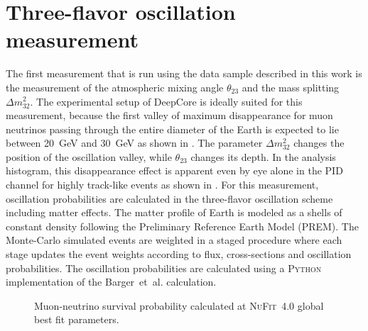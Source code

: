 \chapter{Three-flavor oscillation measurement}
\setchapterpreamble[u]{\margintoc}

The first measurement that is run using the data sample described in this work is the measurement of the atmospheric mixing angle $\theta_{23}$ and the mass splitting $\Delta m^2_{32}$. The experimental setup of DeepCore is ideally suited for this measurement, because the first valley of maximum disappearance for muon neutrinos passing through the entire diameter of the Earth is expected to lie between 20~GeV and 30~GeV as shown in . The parameter $\Delta m^2_{32}$ changes the position of the oscillation valley, while $\theta_{23}$ changes its depth. In the analysis histogram, this disappearance effect is apparent even by eye alone in the PID channel for highly track-like events as shown in . For this measurement, oscillation probabilities are calculated in the three-flavor oscillation scheme including matter effects. The matter profile of Earth is modeled as a shells of constant density following the Preliminary Reference Earth Model (PREM). The Monte-Carlo simulated events are weighted in a staged procedure where each stage updates the event weights according to flux, cross-sections and oscillation probabilities. The oscillation probabilities are calculated using a \textsc{Python} implementation of the Barger~et~al. calculation.

\begin{figure}
    \centering
    
    \caption{Muon-neutrino survival probability calculated at \textsc{NuFit~4.0}\cite{nufit40} global best fit parameters.}
    \label{fig:three-flavor-oscprob}
\end{figure}



